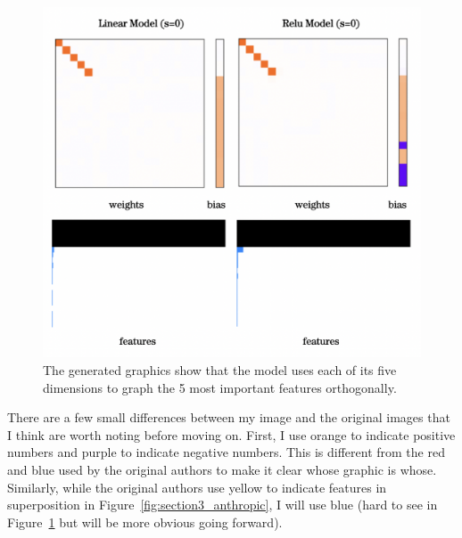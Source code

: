 \documentclass{article} %
\begin{document}
\begin{figure}[h]
    \centering
    \includegraphics[width=0.5\linewidth]{demonstrating_superposition/images/relu_linear_0_sparsity.png}
    \captionsetup{font=footnotesize, width=0.7\linewidth} %
    \caption{The generated graphics show that the model uses each of its five 
    dimensions to graph the 5 most important features orthogonally.}
    \label{fig:relu_linear_0}
\end{figure}

There are a few small differences between my image and the original images that
I think are worth noting before moving on. First, I use orange to indicate
positive numbers and purple to indicate negative numbers. This is different from
the red and blue used by the original authors to make it clear whose graphic is
whose. Similarly, while the original authors use yellow to indicate features in
superposition in Figure~\ref{fig:section3_anthropic}, I will use blue (hard to
see in Figure~\ref{fig:relu_linear_0} but will be more obvious going forward).



\end{document}
